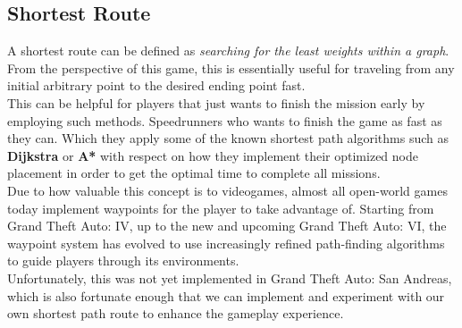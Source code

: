 \documentclass{article}
\begin{document}
	\fi
	
	\newpage
	\subsection*{Shortest Route}
	A shortest route can be defined as \textit{searching for the least weights within a graph}.
	From the perspective of this game, this is essentially useful for traveling from any initial arbitrary point to the desired ending point fast. \\
	
	This can be helpful for players that just wants to finish the mission early by employing such methods. Speedrunners who wants to finish the game as fast as they can. Which they apply some of the known shortest path algorithms such as \textbf{Dijkstra} or \textbf{A*} with respect on how they implement their optimized node placement in order to get the optimal time to complete all missions. \\
	
	Due to how valuable this concept is to videogames, almost all open-world games today implement waypoints for the player to take advantage of. Starting from Grand Theft Auto: IV, up to the new  and upcoming Grand Theft Auto: VI, the waypoint system has evolved to use increasingly refined path-finding algorithms to guide players through its environments. \\
	
	Unfortunately, this was not yet implemented in Grand Theft Auto: San Andreas, which is also fortunate enough that we can implement and experiment with our own shortest path route to enhance the gameplay experience.
	
\end{document}
